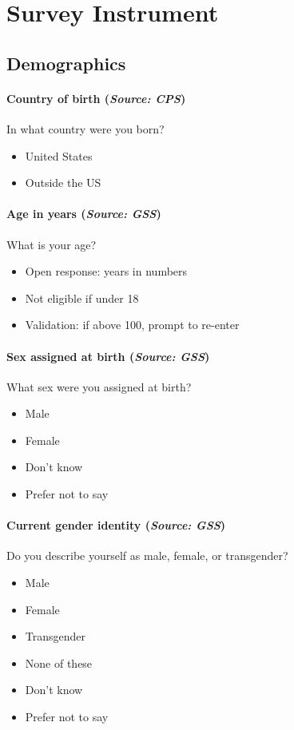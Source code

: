 \setcounter{table}{0}
\renewcommand\thetable{B.\arabic{table}}
\renewcommand\thefigure{B.\arabic{figure}}

\onehalfspacing
\section{Survey Instrument \label{survey}}

\subsection{Demographics}

\paragraph{Country of birth (\textit{Source: CPS})}
In what country were you born?
\begin{itemize}[itemsep=-10pt,topsep=0pt]
\item United States
\item Outside the US
\end{itemize}

\paragraph{Age in years (\textit{Source: GSS})}
What is your age?
\begin{itemize}[itemsep=-10pt,topsep=0pt]
\item Open response: years in numbers
\item Not eligible if under 18
\item Validation: if above 100, prompt to re-enter
\end{itemize}

\paragraph{Sex assigned at birth (\textit{Source: GSS})}
What sex were you assigned at birth?
\begin{itemize}[itemsep=-10pt,topsep=0pt]
\item Male
\item Female
\item Don’t know
\item Prefer not to say
\end{itemize}

\paragraph{Current gender identity (\textit{Source: GSS})}
Do you describe yourself as male, female, or transgender?
\begin{itemize}[itemsep=-10pt,topsep=0pt]
\item Male
\item Female
\item Transgender
\item None of these
\item Don’t know
\item Prefer not to say
\end{itemize}


